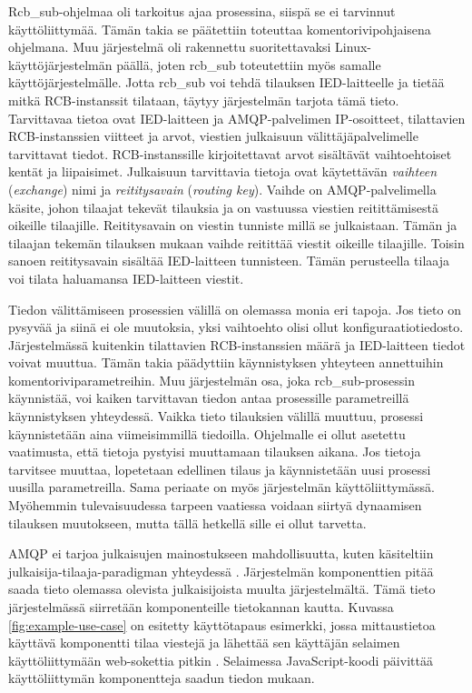 Rcb\_sub-ohjelmaa oli tarkoitus ajaa prosessina, siispä se ei tarvinnut käyttöliittymää. Tämän takia se päätettiin toteuttaa komentorivipohjaisena ohjelmana. Muu järjestelmä oli rakennettu suoritettavaksi Linux-käyttöjärjestelmän päällä, joten rcb\_sub toteutettiin myös samalle käyttöjärjestelmälle. Jotta rcb\_sub voi tehdä tilauksen IED-laitteelle ja tietää mitkä RCB-instanssit tilataan, täytyy järjestelmän tarjota tämä tieto. Tarvittavaa tietoa ovat IED-laitteen ja AMQP-palvelimen IP-osoitteet, tilattavien RCB-instanssien viitteet ja arvot, viestien julkaisuun välittäjäpalvelimelle tarvittavat tiedot. RCB-instanssille kirjoitettavat arvot sisältävät vaihtoehtoiset kentät ja liipaisimet. Julkaisuun tarvittavia tietoja ovat käytettävän \emph{vaihteen} (\emph{exchange}) nimi ja \emph{reititysavain} (\emph{routing key}). Vaihde on AMQP-palvelimella käsite, johon tilaajat tekevät tilauksia ja on vastuussa viestien reitittämisestä oikeille tilaajille. Reititysavain on viestin tunniste millä se julkaistaan. Tämän ja tilaajan tekemän tilauksen mukaan vaihde reitittää viestit oikeille tilaajille. Toisin sanoen reititysavain sisältää IED-laitteen tunnisteen. Tämän perusteella tilaaja voi tilata haluamansa IED-laitteen viestit.

Tiedon välittämiseen prosessien välillä on olemassa monia eri tapoja. Jos tieto on pysyvää ja siinä ei ole muutoksia, yksi vaihtoehto olisi ollut konfiguraatiotiedosto. Järjestelmässä kuitenkin tilattavien RCB-instanssien määrä ja IED-laitteen tiedot voivat muuttua. Tämän takia päädyttiin käynnistyksen yhteyteen annettuihin komentoriviparametreihin. Muu järjestelmän osa, joka rcb\_sub-prosessin käynnistää, voi kaiken tarvittavan tiedon antaa prosessille parametreillä käynnistyksen yhteydessä. Vaikka tieto tilauksien välillä muuttuu, prosessi käynnistetään aina viimeisimmillä tiedoilla. Ohjelmalle ei ollut asetettu vaatimusta, että tietoja pystyisi muuttamaan tilauksen aikana. Jos tietoja tarvitsee muuttaa, lopetetaan edellinen tilaus ja käynnistetään uusi prosessi uusilla parametreilla. Sama periaate on myös järjestelmän käyttöliittymässä. Myöhemmin tulevaisuudessa tarpeen vaatiessa voidaan siirtyä dynaamisen tilauksen muutokseen, mutta tällä hetkellä sille ei ollut tarvetta.

AMQP ei tarjoa julkaisujen mainostukseen mahdollisuutta, kuten käsiteltiin julkaisija-tilaaja-paradigman yhteydessä \cite{AMQP-specification}. Järjestelmän komponenttien pitää saada tieto olemassa olevista julkaisijoista muulta järjestelmältä. Tämä tieto järjestelmässä siirretään komponenteille tietokannan kautta. Kuvassa \ref{fig:example-use-case} on esitetty käyttötapaus esimerkki, jossa mittaustietoa käyttävä komponentti tilaa viestejä ja lähettää sen käyttäjän selaimen käyttöliittymään web-sokettia pitkin \cite{websocket}. Selaimessa JavaScript-koodi päivittää käyttöliittymän komponentteja saadun tiedon mukaan.


